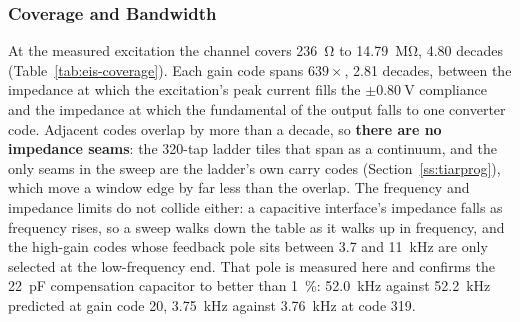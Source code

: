 
\subsubsection{Coverage and Bandwidth}\label{sss:eis-coverage}

At the measured excitation the channel covers \SI{236}{\ohm} to
\SI{14.79}{\mega\ohm}, \num{4.80} decades (Table~\ref{tab:eis-coverage}). Each
gain code spans \(639\times\), \num{2.81} decades, between the impedance at
which the excitation's peak current fills the \(\pm\SI{0.80}{\volt}\) compliance
and the impedance at which the fundamental of the output falls to one converter
code. Adjacent codes overlap by more than a decade, so \textbf{there are no
impedance seams}: the 320-tap ladder tiles that span as a continuum, and the
only seams in the sweep are the ladder's own carry codes
(Section~\ref{ss:tiarprog}), which move a window edge by far less than the
overlap. The frequency and impedance limits do not collide either: a
capacitive interface's impedance falls as frequency rises, so a sweep walks down
the table as it walks up in frequency, and the high-gain codes whose feedback
pole sits between \num{3.7} and \SI{11}{\kilo\hertz} are only selected at the
low-frequency end. That pole is measured here and confirms the
\SI{22}{\pico\farad} compensation capacitor to better than \SI{1}{\percent}:
\SI{52.0}{\kilo\hertz} against \SI{52.2}{\kilo\hertz} predicted at gain code 20,
\SI{3.75}{\kilo\hertz} against \SI{3.76}{\kilo\hertz} at code 319.

